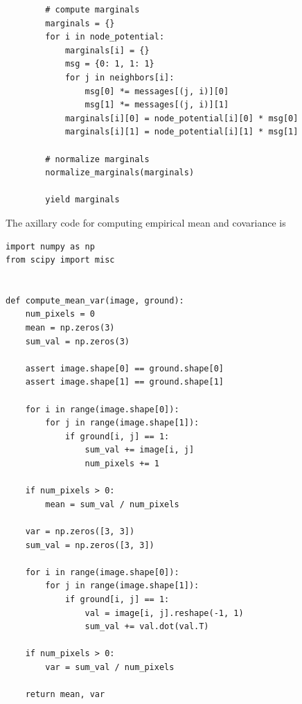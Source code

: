 \documentclass{article}
\begin{document}
\begin{lstlisting}
        # compute marginals
        marginals = {}
        for i in node_potential:
            marginals[i] = {}
            msg = {0: 1, 1: 1}
            for j in neighbors[i]:
                msg[0] *= messages[(j, i)][0]
                msg[1] *= messages[(j, i)][1]
            marginals[i][0] = node_potential[i][0] * msg[0]
            marginals[i][1] = node_potential[i][1] * msg[1]

        # normalize marginals
        normalize_marginals(marginals)

        yield marginals

\end{lstlisting}

The axillary code for computing empirical mean and covariance is 
\lstset{language=Python}
\lstset{frame=lines}
\lstset{basicstyle=\footnotesize}
\begin{lstlisting}
import numpy as np
from scipy import misc


def compute_mean_var(image, ground):
    num_pixels = 0
    mean = np.zeros(3)
    sum_val = np.zeros(3)

    assert image.shape[0] == ground.shape[0]
    assert image.shape[1] == ground.shape[1]

    for i in range(image.shape[0]):
        for j in range(image.shape[1]):
            if ground[i, j] == 1:
                sum_val += image[i, j]
                num_pixels += 1

    if num_pixels > 0:
        mean = sum_val / num_pixels

    var = np.zeros([3, 3])
    sum_val = np.zeros([3, 3])

    for i in range(image.shape[0]):
        for j in range(image.shape[1]):
            if ground[i, j] == 1:
                val = image[i, j].reshape(-1, 1)
                sum_val += val.dot(val.T)

    if num_pixels > 0:
        var = sum_val / num_pixels

    return mean, var

\end{lstlisting}
\pagebreak

\end{document}
